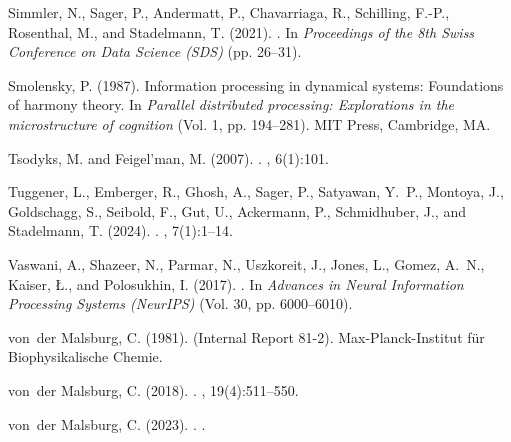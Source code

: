 \documentclass[12pt]{article}
\begin{document}
\begin{thebibliography}{}
Simmler, N., Sager, P., Andermatt, P., Chavarriaga, R., Schilling, F.-P., Rosenthal, M., and Stadelmann, T. (2021).
.
\newblock In {\em Proceedings of the 8th Swiss Conference on Data Science (SDS)} (pp. 26--31).

Smolensky, P. (1987).
\newblock Information processing in dynamical systems: Foundations of harmony theory.
\newblock In {\em Parallel distributed processing: Explorations in the microstructure of cognition} (Vol. 1, pp. 194--281).
\newblock MIT Press, Cambridge, MA.

Tsodyks, M. and Feigel'man, M. (2007).
.
, 6(1):101.

Tuggener, L., Emberger, R., Ghosh, A., Sager, P., Satyawan, Y.~P., Montoya, J., Goldschagg, S., Seibold, F., Gut, U., Ackermann, P., Schmidhuber, J., and Stadelmann, T. (2024).
.
, 7(1):1--14.

Vaswani, A., Shazeer, N., Parmar, N., Uszkoreit, J., Jones, L., Gomez, A.~N., Kaiser, \L., and Polosukhin, I. (2017).
.
\newblock In {\em Advances in Neural Information Processing Systems (NeurIPS)} (Vol. 30, pp. 6000–6010).

von~der Malsburg, C. (1981).
 (Internal Report 81-2).
\newblock Max-Planck-Institut f\"{u}r Biophysikalische Chemie.

von~der Malsburg, C. (2018).
.
, 19(4):511--550.

von~der Malsburg, C. (2023).
.
.


\end{thebibliography}
\end{document}
